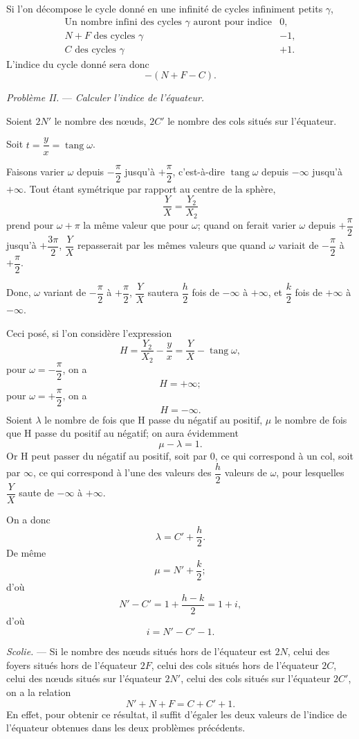 \documentclass[11pt]{article}
\begin{document}
Si l’on décompose le cycle donné en une infinité de cycles infiniment petits $\gamma$,
\[
\begin{array}{rcl}
\text{Un nombre infini des cycles }\gamma\text{ auront pour indice} & 0,\\
N+F\text{ des cycles }\gamma & -1,\\
C\text{ des cycles }\gamma & +1.
\end{array}
\]
L’indice du cycle donné sera donc
\[
-(N+F-C).
\]

\emph{Problème II.} --- \emph{Calculer l’indice de l’équateur.}

Soient $2N'$ le nombre des nœuds, $2C'$ le nombre des cols situés sur l’équateur.

Soit $t=\dfrac yx=\operatorname{tang}\omega$.

Faisons varier $\omega$ depuis $-\dfrac\pi2$ jusqu’à $+\dfrac\pi2$, c’est-à-dire $\operatorname{tang}\omega$ depuis $-\infty$ jusqu’à $+\infty$. Tout étant symétrique par rapport au centre de la sphère,
\[
\frac YX=\frac{Y_2}{X_2}
\]
prend pour $\omega+\pi$ la même valeur que pour $\omega$; quand on ferait varier $\omega$ depuis $+\dfrac\pi2$ jusqu’à $+\dfrac{3\pi}{2}$, $\dfrac YX$ repasserait par les mêmes valeurs que quand $\omega$ variait de $-\dfrac\pi2$ à $+\dfrac\pi2$.

Donc, $\omega$ variant de $-\dfrac\pi2$ à $+\dfrac\pi2$, $\dfrac YX$ sautera $\dfrac h2$ fois de $-\infty$ à $+\infty$, et $\dfrac k2$ fois de $+\infty$ à $-\infty$.

Ceci posé, si l’on considère l’expression
\[
H=\frac{Y_2}{X_2}-\frac yx=\frac YX-\operatorname{tang}\omega,
\]
pour $\omega=-\dfrac\pi2$, on a
\[
H=+\infty;
\]
pour $\omega=+\dfrac\pi2$, on a
\[
H=-\infty.
\]
Soient $\lambda$ le nombre de fois que H passe du négatif au positif, $\mu$ le nombre de fois que H passe du positif au négatif; on aura évidemment
\[
\mu-\lambda=1.
\]
Or H peut passer du négatif au positif, soit par 0, ce qui correspond à un col, soit par $\infty$, ce qui correspond à l’une des valeurs des $\dfrac h2$ valeurs de $\omega$, pour lesquelles $\dfrac YX$ saute de $-\infty$ à $+\infty$.

On a donc
\[
\lambda=C'+\frac h2.
\]
De même
\[
\mu=N'+\frac k2;
\]
d’où
\[
N'-C'=1+\frac{h-k}{2}=1+i,
\]
d’où
\[
i=N'-C'-1.
\]

\emph{Scolie.} --- Si le nombre des nœuds situés hors de l’équateur est $2N$, celui des foyers situés hors de l’équateur $2F$, celui des cols situés hors de l’équateur $2C$, celui des nœuds situés sur l’équateur $2N'$, celui des cols situés sur l’équateur $2C'$, on a la relation
\[
N'+N+F=C+C'+1.
\]
En effet, pour obtenir ce résultat, il suffit d’égaler les deux valeurs de l’indice de l’équateur obtenues dans les deux problèmes précédents.
\end{document}

